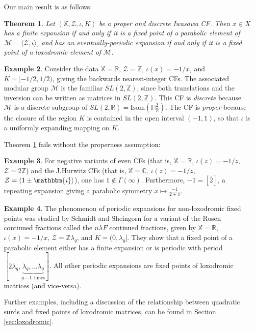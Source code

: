 \documentclass[reqno,10pt]{amsart}
\newcommand{\ii}{\mathbbm{i}}
\renewcommand{\C}{\mathbb{C}}
\newcommand{\Hyp}{\mathbb{H}}
\newcommand{\R}{\mathbb{R}}
\newcommand{\Z}{\mathbb{Z}}
\newcommand{\X}{\mathbb X}
\newcommand{\Isom}{\text{Isom}}
\newtheorem{thm}{Theorem}
\numberwithin{thm}{section}
\theoremstyle{definition}
\theoremstyle{definition}
\newtheorem{example}[thm]{Example}
\numberwithin{equation}{section}
\newcommand{\Mod}{\mathcal M}
\newcommand{\Zee}{\mathcal Z}
\begin{document}
Our main result is as follows:

\begin{thm}
\label{thm:generalmain}
Let $(\X, \Zee, \iota, K)$ be a proper and discrete Iwasawa CF. Then $x\in X$ has a finite expansion if and only if it is a fixed point of a parabolic element of $\Mod=\langle\Zee, \iota\rangle$, and has an eventually-periodic expansion if and only if it is a fixed point of a loxodromic element of $\Mod$.
\end{thm}

\begin{example}
Consider the data $\X=\R$, $\Zee=\Z$, $\iota(x)=-1/x$, and $K=[-1/2,1/2)$, giving the backwards nearest-integer CFs. The associated modular group $\Mod$ is the familiar $SL(2,\Z)$, since both translations and the inversion can be written as matrices in $SL(2,\Z)$. This CF is \emph{discrete} because $\Mod$ is a discrete subgroup of $SL(2,\R)=\Isom(\Hyp^2_\R)$. The CF is \emph{proper} because the closure of the region $K$ is contained in the open interval $(-1,1)$, so that $\iota$ is a uniformly expanding mapping on $K$.
\end{example}

Theorem \ref{thm:generalmain} fails without the properness assumption:
\begin{example}
For negative variants of even CFs (that is, $\X=\R$, $\iota(z)=-1/z$, $\Zee = 2\Z$) and the J.Hurwitz CFs (that is, $\X=\C$, $\iota(z)=-1/z$, $\Zee = \langle 1\pm \ii\rangle $), one has $1\notin \Gamma(\infty)$. Furthermore, $-1=[\overline 2]$, a repeating expansion giving a parabolic symmetry $x\mapsto \frac{-1}{2+x}$.
\end{example} 


\begin{example}
The phenomenon of periodic expansions for non-loxodromic fixed points was studied by Schmidt and Sheingorn \cite{schmidt1995length} for a variant of the Rosen continued fractions called the $n\lambda F$ continued fractions, given by $\X=\R$, $\iota(x)=-1/x$, $\Zee = \mathbb{Z}\lambda_q$, and $K=(0,\lambda_q]$.  They show that a fixed point of a parabolic element either has a finite expansion or is periodic with period $[2\lambda_q,\underbrace{\lambda_q,\dots \lambda_q}_{q-1\text{ times}}]$. All other periodic expansions are fixed points of loxodromic matrices (and vice-versa).
\end{example}

Further examples, including a discussion of the relationship between quadratic surds and fixed points of loxodromic matrices, can be found in Section \ref{sec:loxodromic}.
\end{document}
